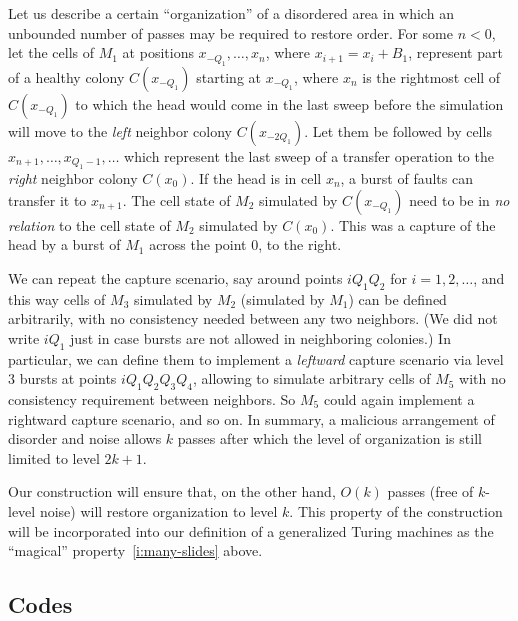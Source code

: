 \documentclass[11pt]{memoir}
\theoremstyle{definition} %
\def\B{B}
\newcommand{\Q}{Q} %
\begin{document}
\begin{example}\label{xpl:unbounded}
  Let us describe a certain ``organization'' of a disordered area in which an unbounded number of passes
  may be required to restore order.
For some \( n<0 \), let the cells of \( M_{1} \) at positions
\( x_{-\Q_{1}},\dots,x_{n} \), where \( x_{i+1}=x_{i}+\B_{1} \),
represent part of a healthy colony \( C(x_{-\Q_{1}}) \) starting at \( x_{-\Q_{1}} \), where \( x_{n} \)
is the rightmost cell of \( C(x_{-\Q_{1}}) \)
to which the head would come in the last sweep before
the simulation will move to the \emph{left} neighbor colony \( C(x_{-2\Q_{1}}) \).
Let them be followed by cells \( x_{n+1},\dots, x_{\Q_{1}-1},\dots\)
which represent the last sweep of a transfer operation to the \emph{right} neighbor colony \( C(x_{0}) \).
If the head is in cell \( x_{n} \), a burst of faults can transfer it to \( x_{n+1} \).
The cell state of \( M_{2} \) simulated by \( C(x_{-\Q_{1}}) \) need to be in \emph{no relation} to 
the cell state of \( M_{2} \) simulated by \( C(x_{0}) \).
This was a capture of the head by a burst of \( M_{1} \) across the point 0, to the right.

We can repeat the capture scenario, say around points \( i \Q_{1}\Q_{2} \) for \( i=1,2,\dots \),
and this way cells of \( M_{3} \) simulated by \( M_{2} \) (simulated by \( M_{1} \))
can be defined arbitrarily, with no consistency needed between any two neighbors.
(We did not write \( i \Q_{1} \) just in case bursts are not allowed in neighboring colonies.)
In particular, we can define them to implement a \emph{leftward} capture scenario
via level 3 bursts at points \( i \Q_{1}\Q_{2}\Q_{3}\Q_{4} \), allowing to simulate arbitrary cells of \( M_{5} \)
with no consistency requirement between neighbors.
So \( M_{5} \) could again implement a rightward capture scenario, and so on.
In summary, a malicious arrangement of disorder and noise allows \( k \) passes
after which the level of organization is still limited to level \( 2 k + 1 \).
\end{example}

Our construction will ensure that, on the other hand,
\( O(k) \) passes (free of \( k \)-level noise) will restore organization to level \( k \).
This property of the construction will be incorporated into our definition of a generalized
Turing machines as the ``magical'' property~\eqref{i:many-slides} above.

\subsection{Codes}\label{sec:codes}
\end{document}
